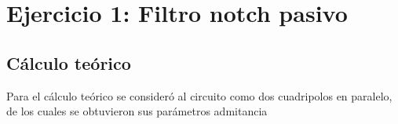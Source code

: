 \section{Ejercicio 1: Filtro notch pasivo}
\subsection{C\'alculo te\'orico}
Para el c\'alculo te\'orico se consider\'o al circuito como dos cuadripolos en paralelo, de los cuales se obtuvieron sus par\'ametros admitancia